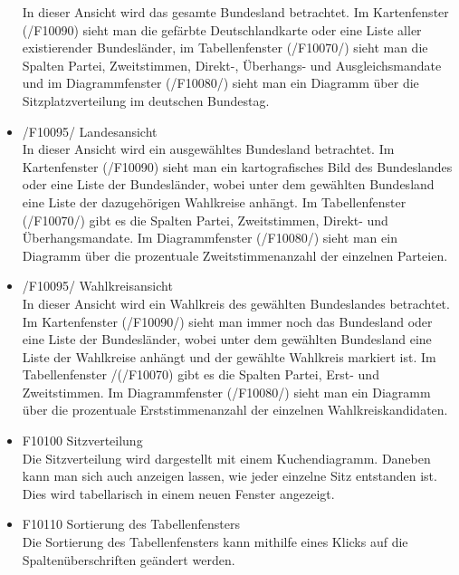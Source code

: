 \documentclass[10pt,a4paper]{article}
\begin{document}
\begin{itemize}
	In dieser Ansicht wird das gesamte Bundesland betrachtet. Im Kartenfenster (/F10090) sieht man die gefärbte Deutschlandkarte oder eine Liste aller existierender Bundesländer, im Tabellenfenster (/F10070/) sieht man die Spalten Partei, Zweitstimmen, Direkt-, Überhangs- und Ausgleichsmandate und im Diagrammfenster (/F10080/) sieht man ein Diagramm über die Sitzplatzverteilung im deutschen Bundestag.
	\item /F10095/ Landesansicht \hfill \\
	In dieser Ansicht wird ein ausgewähltes Bundesland betrachtet. Im Kartenfenster (/F10090) sieht man ein kartografisches Bild des Bundeslandes oder eine Liste der Bundesländer, wobei unter dem gewählten Bundesland eine Liste der dazugehörigen Wahlkreise anhängt. Im Tabellenfenster (/F10070/) gibt es die Spalten Partei, Zweitstimmen, Direkt- und Überhangsmandate. Im Diagrammfenster (/F10080/) sieht man ein Diagramm über die prozentuale Zweitstimmenanzahl der einzelnen Parteien.
	\item /F10095/ Wahlkreisansicht \hfill \\
	In dieser Ansicht wird ein Wahlkreis des gewählten Bundeslandes betrachtet. Im Kartenfenster (/F10090/) sieht man immer noch das Bundesland oder eine Liste der Bundesländer, wobei unter dem gewählten Bundesland eine Liste der Wahlkreise anhängt und der gewählte Wahlkreis markiert ist. Im Tabellenfenster /(/F10070) gibt es die  Spalten Partei, Erst- und Zweitstimmen. Im Diagrammfenster (/F10080/) sieht man ein Diagramm über die prozentuale Erststimmenanzahl der einzelnen Wahlkreiskandidaten. 
	\item F10100 Sitzverteilung \hfill \\
	Die Sitzverteilung wird dargestellt mit einem Kuchendiagramm. Daneben kann man sich auch anzeigen lassen, wie jeder einzelne Sitz entstanden ist. Dies wird tabellarisch in einem neuen Fenster angezeigt.
	\item F10110 Sortierung des Tabellenfensters \hfill \\
	Die Sortierung des Tabellenfensters kann mithilfe eines Klicks auf die Spaltenüberschriften geändert werden.
\end{itemize}
\end{document}
